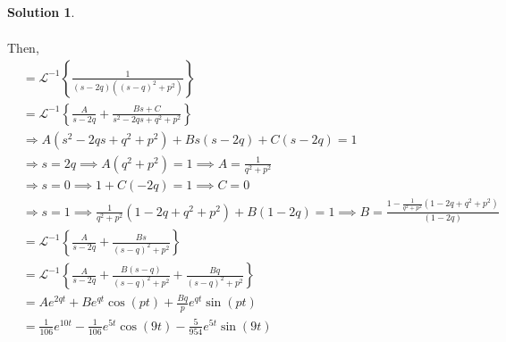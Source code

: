 \documentclass[10pt]{article}
\theoremstyle{definition}
\newtheorem{soln}{Solution}
\newcommand{\laplacei}[1]{\mathcal{L}^{-1}\left\{#1\right\}}
\begin{document}
\begin{soln}
\begin{enumerate}[label=(\alph*)]
\begin{align*}
          \end{align*}
          Then,
          \begin{align*}
             & = \laplacei{\frac{1}{\left(s-2q\right)\left(\left(s-q\right)^2+p^2\right)}}     \\
             & = \laplacei{\frac{A}{s-2q}+\frac{Bs+C}{s^2-2qs+q^2+p^2}} \\
             & \Rightarrow A\left(s^2-2qs+q^2+p^2\right)+Bs\left(s-2q\right)+C\left(s-2q\right)=1                  \\
             & \Rightarrow s=2q \implies A\left(q^2+p^2\right)=1 \implies A=\frac{1}{q^2+p^2}  \\
             & \Rightarrow s=0 \implies 1+C\left(-2q\right)=1 \implies C=0  \\
             & \Rightarrow s=1 \implies \frac{1}{q^2+p^2}\left(1-2q+q^2+p^2\right)+B\left(1-2q\right)=1 \implies B=\frac{1-\frac{1}{q^2+p^2}\left(1-2q+q^2+p^2\right)}{\left(1-2q\right)}  \\
             & = \laplacei{\frac{A}{s-2q}+\frac{Bs}{\left(s-q\right)^2+p^2}}\\
             & = \laplacei{\frac{A}{s-2q}+\frac{B\left(s-q\right)}{\left(s-q\right)^2+p^2}+\frac{Bq}{\left(s-q\right)^2+p^2}}\\
             & = Ae^{2qt}+Be^{qt}\cos\left(pt\right)+\frac{Bq}{p}e^{qt}\sin\left(pt\right)\\
             & = \frac{1}{106}e^{10t}-\frac{1}{106}e^{5t}\cos\left(9t\right)-\frac{5}{954}e^{5t}\sin\left(9t\right)
          \end{align*}

  \end{enumerate}
\end{soln}
\end{document}
